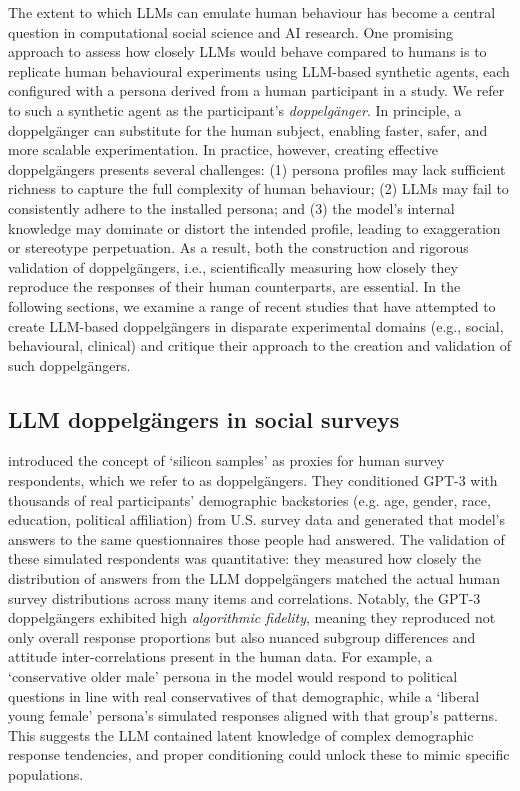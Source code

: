The extent to which LLMs can emulate human behaviour has become a central question in computational social science and AI research. One promising approach to assess how closely LLMs would behave compared to humans is to replicate human behavioural experiments using LLM-based synthetic agents, each configured with a persona derived from a human participant in a study. We refer to such a synthetic agent as the participant's \emph{doppelgänger}. In principle, a doppelgänger can substitute for the human subject, enabling faster, safer, and more scalable experimentation. In practice, however, creating effective doppelgängers presents several challenges: (1) persona profiles may lack sufficient richness to capture the full complexity of human behaviour; (2) LLMs may fail to consistently adhere to the installed persona; and (3) the model's internal knowledge may dominate or distort the intended profile, leading to exaggeration or stereotype perpetuation. As a result, both the construction and rigorous validation of doppelgängers, i.e., scientifically measuring how closely they reproduce the responses of their human counterparts, are essential. In the following sections, we examine a range of recent studies that have attempted to create LLM-based doppelgängers in disparate experimental domains (e.g., social, behavioural, clinical) and critique their approach to the creation and validation of such doppelgängers.


\subsection{LLM doppelgängers in social surveys}

\cite{Argyle2023} introduced the concept of `silicon samples' as proxies for human survey respondents, which we refer to as doppelgängers. They conditioned GPT-3 with thousands of real participants' demographic backstories (e.g. age, gender, race, education, political affiliation) from U.S. survey data and generated that model's answers to the same questionnaires those people had answered. The validation of these simulated respondents was quantitative: they measured how closely the distribution of answers from the LLM doppelgängers matched the actual human survey distributions across many items and correlations. Notably, the GPT-3 doppelgängers exhibited high \textit{algorithmic fidelity}, meaning they reproduced not only overall response proportions but also nuanced subgroup differences and attitude inter-correlations present in the human data. For example, a `conservative older male’ persona in the model would respond to political questions in line with real conservatives of that demographic, while a `liberal young female' persona’s simulated responses aligned with that group’s patterns. This suggests the LLM contained latent knowledge of complex demographic response tendencies, and proper conditioning could unlock these to mimic specific populations.

